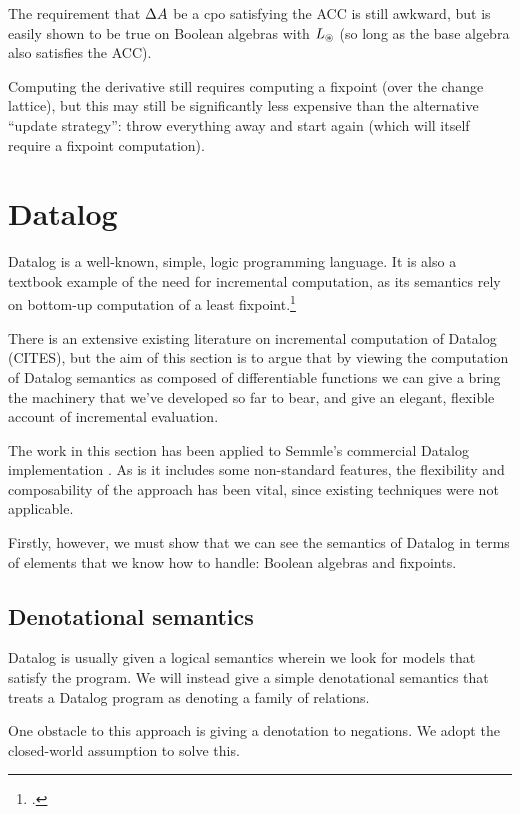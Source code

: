 The requirement that $\Delta A$ be a cpo satisfying the ACC is still awkward, but is easily
shown to be true on Boolean algebras with $L_\circledast$ (so long as the base
algebra also satisfies the ACC).

Computing the derivative still requires computing a fixpoint (over the change
lattice), but this may still be significantly less expensive than the
alternative ``update strategy'': throw everything away and start
again (which will itself require a fixpoint computation).

\section{Datalog}
\label{sec:datalog}

Datalog is a well-known, simple, logic programming language. It is also a textbook
example of the need for incremental computation, as its semantics rely on
bottom-up computation of a least fixpoint.\footcite[See][part D]{abiteboul1995foundations}

There is an extensive existing literature on incremental computation of Datalog
(CITES), but the aim of this section is to argue that by viewing the computation
of Datalog semantics as composed of differentiable functions we can give a
bring the machinery that we've developed so far to bear, and give an elegant,
flexible account of incremental evaluation.

The work in this section has been applied to Semmle's commercial Datalog
implementation \parencites{semmleWebsite}{avgustinov2016ql}{sereni2008adding}{schafer2010type}.
As is it includes some non-standard features, the flexibility and composability
of the approach has been vital, since existing techniques were not applicable.

Firstly, however, we must show that we can see the semantics of Datalog in terms
of elements that we know how to handle: Boolean algebras and fixpoints.

\subsection{Denotational semantics}

Datalog is usually given a logical semantics wherein we look for models that
satisfy the program. We will instead give a simple denotational semantics that treats a Datalog
program as denoting a family of relations.

One obstacle to this approach is giving a denotation to negations. We adopt the
closed-world assumption to solve this.


